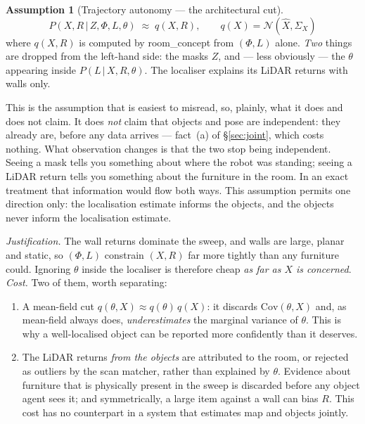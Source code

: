 \documentclass[11pt,a4paper]{report}
\newcommand{\given}{\,|\,}
\theoremstyle{definition}   %
\newtheorem{assumption}{Assumption}
\begin{document}
\begin{assumption}[Trajectory autonomy — the architectural cut]\label{as:meanfield}
\begin{equation}
P\!\left(X,R\given Z,\Phi,L,\theta\right)\;\approx\;q(X,R),
\qquad
q(X)=\mathcal{N}\!\left(\hat X,\Sigma_X\right)
\end{equation}
where $q(X,R)$ is computed by \textsf{room\_concept} from $(\Phi,L)$ alone. \emph{Two} things are
dropped from the left-hand side: the masks $Z$, and --- less obviously --- the $\theta$ appearing
inside $P(L\given X,R,\theta)$. The localiser explains its LiDAR returns with walls only.

\smallskip
This is the assumption that is easiest to misread, so, plainly, what it does and does not claim.
It does \emph{not} claim that objects and pose are independent: they already are, before any data
arrives --- fact~(a) of \S\ref{sec:joint}, which costs nothing. What observation changes is that
the two stop being independent. Seeing a mask tells you something about where the robot was
standing; seeing a LiDAR return tells you something about the furniture in the room. In an exact
treatment that information would flow both ways. This assumption permits one direction only: the
localisation estimate informs the objects, and the objects never inform the localisation estimate.
\end{assumption}
\noindent\textit{Justification.} The wall returns dominate the sweep, and walls are large,
planar and static, so $(\Phi,L)$ constrain $(X,R)$ far more tightly than any furniture could.
Ignoring $\theta$ inside the localiser is therefore cheap \emph{as far as $X$ is concerned}.
\textit{Cost.} Two of them, worth separating:
\begin{enumerate}[label=(\roman*),leftmargin=1.9em,topsep=3pt,itemsep=3pt]
\item A mean-field cut $q(\theta,X)\approx q(\theta)\,q(X)$: it discards $\mathrm{Cov}(\theta,X)$
      and, as mean-field always does, \emph{underestimates} the marginal variance of $\theta$.
      This is why a well-localised object can be reported more confidently than it deserves.
\item The LiDAR returns \emph{from the objects} are attributed to the room, or rejected as
      outliers by the scan matcher, rather than explained by $\theta$. Evidence about furniture
      that is physically present in the sweep is discarded before any object agent sees it; and
      symmetrically, a large item against a wall can bias $R$. This cost has no counterpart in a
      system that estimates map and objects jointly.
\end{enumerate}
\end{document}
